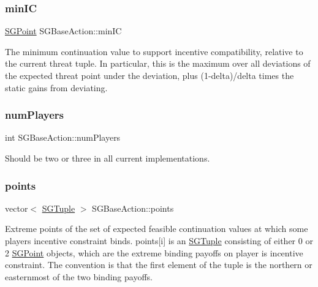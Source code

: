 \subsubsection{\texorpdfstring{min\+IC}{minIC}}
{\footnotesize\ttfamily \hyperlink{classSGPoint}{S\+G\+Point} S\+G\+Base\+Action\+::min\+IC\hspace{0.3cm}{\ttfamily [protected]}}

The minimum continuation value to support incentive compatibility, relative to the current threat tuple. In particular, this is the maximum over all deviations of the expected threat point under the deviation, plus (1-\/delta)/delta times the static gains from deviating. \mbox{\label{classSGBaseAction_a88066434fc68234175141e4bc19b1648}} 
\subsubsection{\texorpdfstring{num\+Players}{numPlayers}}
{\footnotesize\ttfamily int S\+G\+Base\+Action\+::num\+Players\hspace{0.3cm}{\ttfamily [protected]}}

Should be two or three in all current implementations. \mbox{\label{classSGBaseAction_a4d200e71f5bcfad3fe039293e90dbd70}} 
\subsubsection{\texorpdfstring{points}{points}}
{\footnotesize\ttfamily vector$<$ \hyperlink{classSGTuple}{S\+G\+Tuple} $>$ S\+G\+Base\+Action\+::points\hspace{0.3cm}{\ttfamily [protected]}}

Extreme points of the set of expected feasible continuation values at which some player\textquotesingle{}s incentive constraint binds. points\mbox{[}i\mbox{]} is an \hyperlink{classSGTuple}{S\+G\+Tuple} consisting of either 0 or 2 \hyperlink{classSGPoint}{S\+G\+Point} objects, which are the extreme binding payoffs on player i\textquotesingle{}s incentive constraint. The convention is that the first element of the tuple is the northern or easternmost of the two binding payoffs. \mbox{\label{classSGBaseAction_a2301bf142f93f7d3ddedd44676d10c6a}} 

